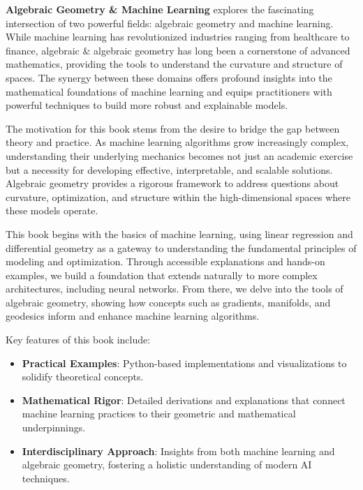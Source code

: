 %
%

\preface

\textbf{Algebraic Geometry \& Machine Learning} explores the fascinating intersection of two powerful fields: algebraic geometry and machine learning. While machine learning has revolutionized industries ranging from healthcare to finance, algebraic \& algebraic geometry has long been a cornerstone of advanced mathematics, providing the tools to understand the curvature and structure of spaces. The synergy between these domains offers profound insights into the mathematical foundations of machine learning and equips practitioners with powerful techniques to build more robust and explainable models.

The motivation for this book stems from the desire to bridge the gap between theory and practice. As machine learning algorithms grow increasingly complex, understanding their underlying mechanics becomes not just an academic exercise but a necessity for developing effective, interpretable, and scalable solutions. Algebraic geometry provides a rigorous framework to address questions about curvature, optimization, and structure within the high-dimensional spaces where these models operate.

This book begins with the basics of machine learning, using linear regression and differential geometry as a gateway to understanding the fundamental principles of modeling and optimization. Through accessible explanations and hands-on examples, we build a foundation that extends naturally to more complex architectures, including neural networks. From there, we delve into the tools of algebraic geometry, showing how concepts such as gradients, manifolds, and geodesics inform and enhance machine learning algorithms.

Key features of this book include:
\begin{itemize}
    \item \textbf{Practical Examples}: Python-based implementations and visualizations to solidify theoretical concepts.
    \item \textbf{Mathematical Rigor}: Detailed derivations and explanations that connect machine learning practices to their geometric and mathematical underpinnings.
    \item \textbf{Interdisciplinary Approach}: Insights from both machine learning and algebraic geometry, fostering a holistic understanding of modern AI techniques.
\end{itemize}



